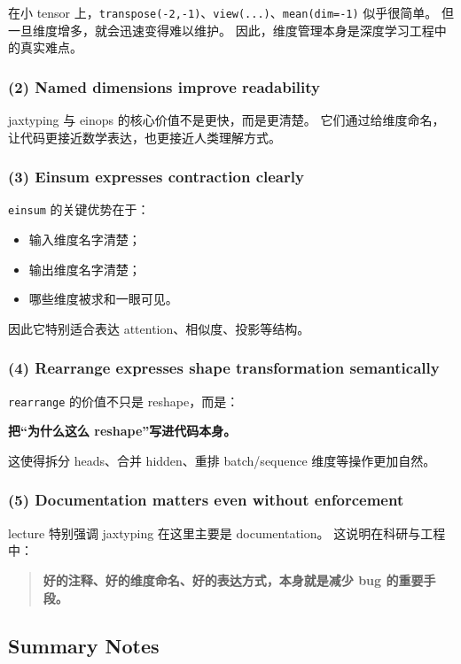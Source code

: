 \documentclass[a4paper,UTF8]{article}
\numberwithin{equation}{section}
\begin{document}
在小 tensor 上，\verb|transpose(-2,-1)|、\verb|view(...)|、\verb|mean(dim=-1)| 似乎很简单。  
但一旦维度增多，就会迅速变得难以维护。  
因此，维度管理本身是深度学习工程中的真实难点。

\subsubsection{(2) Named dimensions improve readability}

jaxtyping 与 einops 的核心价值不是更快，而是更清楚。  
它们通过给维度命名，让代码更接近数学表达，也更接近人类理解方式。

\subsubsection{(3) Einsum expresses contraction clearly}

\verb|einsum| 的关键优势在于：
\begin{itemize}
    \item 输入维度名字清楚；
    \item 输出维度名字清楚；
    \item 哪些维度被求和一眼可见。
\end{itemize}

因此它特别适合表达 attention、相似度、投影等结构。

\subsubsection{(4) Rearrange expresses shape transformation semantically}

\verb|rearrange| 的价值不只是 reshape，而是：
\begin{center}
\textbf{把“为什么这么 reshape”写进代码本身。}
\end{center}

这使得拆分 heads、合并 hidden、重排 batch/sequence 维度等操作更加自然。

\subsubsection{(5) Documentation matters even without enforcement}

lecture 特别强调 jaxtyping 在这里主要是 documentation。  
这说明在科研与工程中：
\begin{quote}
\textbf{好的注释、好的维度命名、好的表达方式，本身就是减少 bug 的重要手段。}
\end{quote}

\subsection{Summary Notes}
\end{document}
